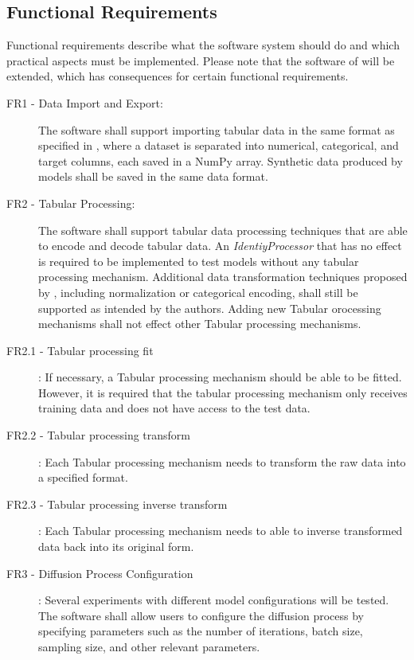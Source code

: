 \subsection*{Functional Requirements}
\label{sec:func_requirements}
Functional requirements describe what the software system should do and which practical aspects must be implemented.
Please note that the software of \cite{kotelnikov2022TabDDPMModellingTabular} will be extended, which has consequences for certain functional requirements.

\begin{description}
    \item[FR1 - Data Import and Export:]
    The software shall support importing tabular data in the same format as specified in \cite{kotelnikov2022TabDDPMModellingTabular},
    where a dataset is separated into numerical, categorical, and target columns, each saved in a NumPy \cite{harris2020array} array. 
    Synthetic data produced by models shall be saved in the same data format.

    \item[FR2 - Tabular Processing:]
    The software shall support tabular data processing techniques that are able to encode and decode tabular data. 
    An \textit{IdentiyProcessor} that has no effect is required to be implemented to test models without any tabular processing mechanism.
    Additional data transformation techniques proposed by \cite{kotelnikov2022TabDDPMModellingTabular}, including normalization or categorical encoding, shall still be supported as intended by the authors.
    Adding new Tabular orocessing mechanisms shall not effect other Tabular processing mechanisms.

    \item[FR2.1 - Tabular processing fit]:
    If necessary, a Tabular processing mechanism should be able to be fitted.
    However, it is required that the tabular processing mechanism only receives training data and does not have access to the test data.

    \item[FR2.2 - Tabular processing transform]:
    Each Tabular processing mechanism needs to transform the raw data into a specified format.

    \item[FR2.3 - Tabular processing inverse transform]:
    Each Tabular processing mechanism needs to able to inverse transformed data back into its original form.

    \item[FR3 - Diffusion Process Configuration]:
    Several experiments with different model configurations will be tested.
    The software shall allow users to configure the diffusion process by specifying parameters such as the number of iterations, batch size, sampling size, and other relevant parameters.


\end{description}
